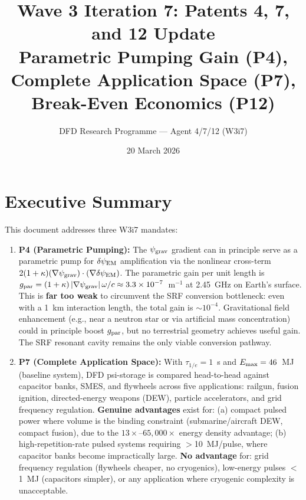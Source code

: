 \documentclass[11pt]{article}
\title{Wave 3 Iteration 7: Patents 4, 7, and 12 Update\\
\large Parametric Pumping Gain (P4), Complete Application Space (P7),\\
Break-Even Economics (P12)}
\author{DFD Research Programme --- Agent 4/7/12 (W3i7)}
\date{20 March 2026}
\newcommand{\ee}[1]{\times 10^{#1}}
\newcommand{\psigrav}{\psi_{\rm grav}}
\newcommand{\dpsiEM}{\delta\psi_{\rm EM}}
\begin{document}
\maketitle
\tableofcontents
\newpage

\section*{Executive Summary}

This document addresses three W3i7 mandates:

\begin{enumerate}
\item \textbf{P4 (Parametric Pumping):} The $\psigrav$ gradient can in
  principle serve as a parametric pump for $\dpsiEM$ amplification via the
  nonlinear cross-term $2(1+\kappa)(\nabla\psigrav)\cdot(\nabla\dpsiEM)$.
  The parametric gain per unit length is
  $g_{\rm par} = (1+\kappa)\,|\nabla\psigrav|\,\omega/c \approx
  3.3\ee{-7}$~m$^{-1}$ at 2.45~GHz on Earth's surface. This is
  \textbf{far too weak} to circumvent the SRF conversion bottleneck:
  even with a 1~km interaction length, the total gain is $\sim 10^{-4}$.
  Gravitational field enhancement (e.g., near a neutron star or via
  artificial mass concentration) could in principle boost $g_{\rm par}$,
  but no terrestrial geometry achieves useful gain. The SRF resonant
  cavity remains the only viable conversion pathway.

\item \textbf{P7 (Complete Application Space):} With $\tau_{1/e} = 1$~s
  and $E_{\rm max} = 46$~MJ (baseline system), DFD psi-storage is
  compared head-to-head against capacitor banks, SMES, and flywheels
  across five applications: railgun, fusion ignition, directed-energy
  weapons (DEW), particle accelerators, and grid frequency regulation.
  \textbf{Genuine advantages} exist for: (a) compact pulsed power where
  volume is the binding constraint (submarine/aircraft DEW, compact
  fusion), due to the $13\times$--$65{,}000\times$ energy density
  advantage; (b) high-repetition-rate pulsed systems requiring
  $>$10~MJ/pulse, where capacitor banks become impractically large.
  \textbf{No advantage} for: grid frequency regulation (flywheels
  cheaper, no cryogenics), low-energy pulses $<$1~MJ (capacitors
  simpler), or any application where cryogenic complexity is
  unacceptable.


\end{enumerate}
\end{document}
